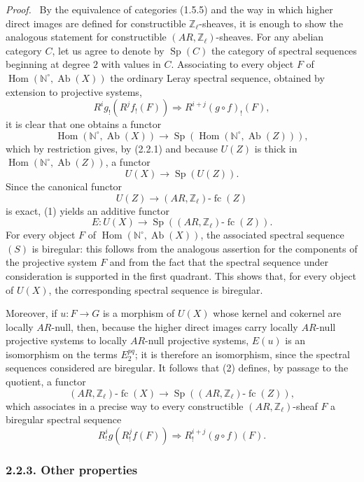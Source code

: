 \documentclass[11pt]{article}
\newenvironment{prooftext}[1][Proof]{\par\noindent\emph{#1.}\ }{\par\medskip}
\DeclareMathOperator{\Hom}{Hom}
\providecommand{\Hom}{\operatorname{Hom}}
\providecommand{\Sp}{\operatorname{Sp}}
\providecommand{\Ab}{\operatorname{Ab}}
\providecommand{\fc}{\operatorname{fc}}
\providecommand{\Ab}{\operatorname{Ab}}
\providecommand{\Hom}{\operatorname{Hom}}
\begin{document}
\begin{prooftext}[Proof]
By the equivalence of categories (1.5.5) and the way in which higher direct images are defined for constructible \(\mathbb Z_\ell\)-sheaves, it is enough to show the analogous statement for constructible \((AR,\mathbb Z_\ell)\)-sheaves. For any abelian category \(C\), let us agree to denote by \(\Sp(C)\) the category of spectral sequences beginning at degree \(2\) with values in \(C\). Associating to every object \(F\) of \(\Hom(\mathbb N^\circ,\Ab(X))\) the ordinary Leray spectral sequence, obtained by extension to projective systems,
\[
R^i g_!(R^j f_!(F))\Longrightarrow R^{i+j}(g\circ f)_!(F),
\tag{S}
\]
it is clear that one obtains a functor
\[
\Hom(\mathbb N^\circ,\Ab(X))\longrightarrow \Sp(\Hom(\mathbb N^\circ,\Ab(Z))),
\]
which by restriction gives, by (2.2.1) and because \(U(Z)\) is thick in \(\Hom(\mathbb N^\circ,\Ab(Z))\), a functor
\[
U(X)\longrightarrow \Sp(U(Z)).
\tag{1}
\]
Since the canonical functor
\[
U(Z)\longrightarrow (AR,\mathbb Z_\ell)\text{-}\fc(Z)
\]
is exact, (1) yields an additive functor
\[
E:U(X)\longrightarrow \Sp((AR,\mathbb Z_\ell)\text{-}\fc(Z)).
\tag{2}
\]
For every object \(F\) of \(\Hom(\mathbb N^\circ,\Ab(X))\), the associated spectral sequence \((S)\) is biregular: this follows from the analogous assertion for the components of the projective system \(F\) and from the fact that the spectral sequence under consideration is supported in the first quadrant. This shows that, for every object of \(U(X)\), the corresponding spectral sequence is biregular.

Moreover, if \(u:F\to G\) is a morphism of \(U(X)\) whose kernel and cokernel are locally \(AR\)-null, then, because the higher direct images carry locally \(AR\)-null projective systems to locally \(AR\)-null projective systems, \(E(u)\) is an isomorphism on the terms \(E_2^{pq}\); it is therefore an isomorphism, since the spectral sequences considered are biregular. It follows that (2) defines, by passage to the quotient, a functor
\[
(AR,\mathbb Z_\ell)\text{-}\fc(X)
\longrightarrow \Sp((AR,\mathbb Z_\ell)\text{-}\fc(Z)),
\tag{3}
\]
which associates in a precise way to every constructible \((AR,\mathbb Z_\ell)\)-sheaf \(F\) a biregular spectral sequence
\[
R^i_!g(R^j_!f(F))\Longrightarrow R^{i+j}_!(g\circ f)(F).
\]
\end{prooftext}

\subsubsection*{2.2.3. Other properties}
\end{document}
